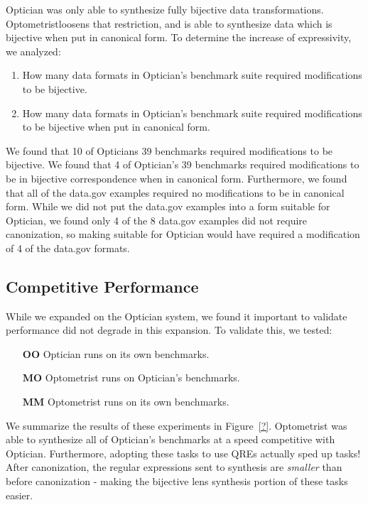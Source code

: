 \documentclass{svproc}
\newcommand{\SystemOnBenchmarks}{\textbf{MM}}
\newcommand{\SystemOnOptician}{\textbf{MO}}
\newcommand{\OpticianRuntime}{\textbf{OO}}
\newcommand{\Name}{Optometrist}
\begin{document}
Optician was only able to synthesize fully bijective data transformations.
\Name loosens that restriction, and is able to synthesize data which is
bijective when put in canonical form.
To determine the increase of expressivity, we analyzed:
\begin{enumerate}
\item How many data formats in Optician's benchmark suite required modifications
  to be bijective.
\item How many data formats in Optician's benchmark suite required modifications
  to be bijective when put in canonical form.
\end{enumerate}

We found that 10 of Opticians 39 benchmarks required modifications to be
bijective. We found that 4 of Optician's 39
benchmarks required modifications to be in bijective correspondence when in
canonical form.  Furthermore, we found that all of the data.gov examples
required no modifications to be in canonical form.  While we did not put the
data.gov examples into a form suitable for Optician, we found only 4 of
the 8 data.gov examples did not require canonization, so making suitable
for Optician would have required a modification of 4 of the data.gov
formats.

\subsection{Competitive Performance}

While we expanded on the Optician system, we found it important to validate
performance did not degrade in this expansion.  To validate this, we tested:
\begin{itemize}
\item[\OpticianRuntime{}] Optician runs on its own benchmarks.
\item[\SystemOnOptician{}] \Name{} runs on Optician's benchmarks.
\item[\SystemOnBenchmarks{}] \Name{} runs on its own benchmarks.
\end{itemize}

We summarize the results of these experiments in Figure~\ref{?}.  \Name{} was
able to synthesize all of Optician's benchmarks at a speed competitive with
Optician.  Furthermore, adopting these tasks to use QREs actually sped up
tasks!  After canonization, the regular expressions sent to synthesis are
\emph{smaller} than before canonization - making the bijective lens synthesis
portion of these tasks easier.
\end{document}
